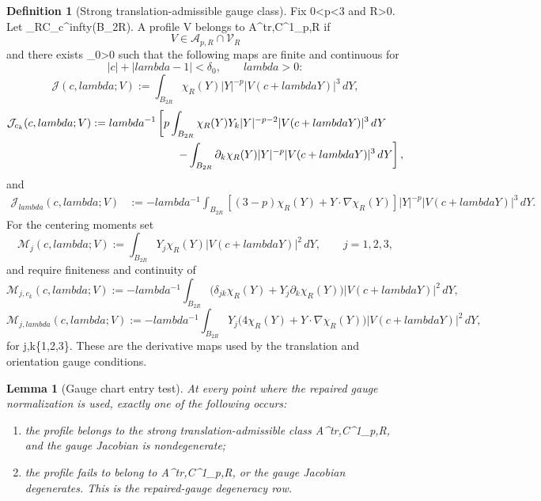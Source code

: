 \documentclass[11pt]{amsart}
\def\({}%
\def\){}%
\def\lambda{lambda}%
\def\infty{infty}%
\theoremstyle{plain}
\newtheorem{lemma}[lemma]{Lemma}
\theoremstyle{definition}
\newtheorem{definition}[definition]{Definition}
\theoremstyle{remark}
\begin{document}
\begin{definition}[Strong translation-admissible gauge class]
\label{paper2:def:strong-translation-admissible-gauge-class}
Fix \(0<p<3\) and \(R>0\).  Let \(\chi_R\in C_c^\infty(B_{2R})\).
A profile \(V\) belongs to \(\mathcal A^{\rm tr,C^1}_{p,R}\) if
\[
   V\in \mathcal A_{p,R}\cap\mathcal V_R
\]
and there exists \(\delta_0>0\) such that the following maps are finite and
continuous for
\[
   |c|+|\lambda-1|<\delta_0,\qquad \lambda>0:
\]
\[
   \mathcal J(c,\lambda;V)
   :=
   \int_{B_{2R}}\chi_R(Y)|Y|^{-p}|V(c+\lambda Y)|^3\,dY ,
\]
\[
\begin{aligned}
   \mathcal J_{c_k}(c,\lambda;V)
   &:=
   \lambda^{-1}
   \left[
   p\int_{B_{2R}}\chi_R(Y)Y_k|Y|^{-p-2}|V(c+\lambda Y)|^3\,dY \right.\\
   &\hspace{2.7cm}\left.
   -
   \int_{B_{2R}}\partial_k\chi_R(Y)|Y|^{-p}|V(c+\lambda Y)|^3\,dY
   \right],
\end{aligned}
\]
and
\[
\begin{aligned}
   \mathcal J_{\lambda}(c,\lambda;V)
   &:=
   -\lambda^{-1}
   \int_{B_{2R}}
   \left[(3-p)\chi_R(Y)+Y\cdot\nabla\chi_R(Y)\right]
   |Y|^{-p}|V(c+\lambda Y)|^3\,dY .
\end{aligned}
\]
For the centering moments set
\[
   \mathcal M_j(c,\lambda;V)
   :=
   \int_{B_{2R}}Y_j\chi_R(Y)|V(c+\lambda Y)|^2\,dY,
   \qquad j=1,2,3,
\]
and require finiteness and continuity of
\[
   \mathcal M_{j,c_k}(c,\lambda;V)
   :=
   -\lambda^{-1}
   \int_{B_{2R}}
   \bigl(\delta_{jk}\chi_R(Y)+Y_j\partial_k\chi_R(Y)\bigr)
   |V(c+\lambda Y)|^2\,dY,
\]
\[
   \mathcal M_{j,\lambda}(c,\lambda;V)
   :=
   -\lambda^{-1}
   \int_{B_{2R}}
   Y_j\bigl(4\chi_R(Y)+Y\cdot\nabla\chi_R(Y)\bigr)
   |V(c+\lambda Y)|^2\,dY,
\]
for \(j,k\in\{1,2,3\}\).  These are the derivative maps used by the
translation and orientation gauge conditions.
\end{definition}

\begin{lemma}[Gauge chart entry test]
\label{paper2:lem:strong-gauge-chart-entry-test}
\label{paper2:lem:gauge-differentiability-entry}
At every point where the repaired gauge normalization is used, exactly one of
the following occurs:
\begin{enumerate}[label=\textup{(\roman*)}]
\item the profile belongs to the strong translation-admissible class
\(\mathcal A^{\rm tr,C^1}_{p,R}\), and the gauge Jacobian is nondegenerate;
\item the profile fails to belong to
\(\mathcal A^{\rm tr,C^1}_{p,R}\), or the gauge Jacobian degenerates.  This is
the repaired-gauge degeneracy row.
\end{enumerate}
\end{lemma}
\end{document}
